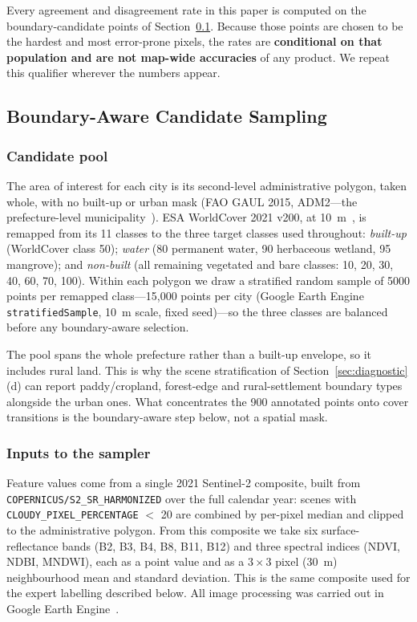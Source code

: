 Every agreement and disagreement rate in this paper is computed on the
boundary-candidate points of Section~\ref{sec:sampling}. Because those points
are chosen to be the hardest and most error-prone pixels, the rates are
\textbf{conditional on that population and are not map-wide accuracies} of any
product. We repeat this qualifier wherever the numbers appear.

\subsection{Boundary-Aware Candidate Sampling}\label{sec:sampling}

\subsubsection*{Candidate pool}

The area of interest for each city is its second-level administrative polygon,
taken whole, with no built-up or urban mask (FAO GAUL 2015, ADM2---the
prefecture-level municipality~\citep{fao2015gaul}). ESA WorldCover 2021 v200, at
10~m~\citep{zanaga2022}, is remapped from its 11 classes to the three target
classes used throughout: \emph{built-up} (WorldCover class 50); \emph{water} (80
permanent water, 90 herbaceous wetland, 95 mangrove); and \emph{non-built} (all
remaining vegetated and bare classes: 10, 20, 30, 40, 60, 70, 100). Within each
polygon we draw a stratified random sample of 5000 points per remapped
class---15,000 points per city (Google Earth Engine \texttt{stratifiedSample},
10~m scale, fixed seed)---so the three classes are balanced before any
boundary-aware selection.

The pool spans the whole prefecture rather than a built-up envelope, so it
includes rural land. This is why the scene stratification of
Section~\ref{sec:diagnostic}(d) can report paddy/cropland, forest-edge and
rural-settlement boundary types alongside the urban ones. What concentrates the
900 annotated points onto cover transitions is the boundary-aware step below,
not a spatial mask.

\subsubsection*{Inputs to the sampler}

Feature values come from a single 2021 Sentinel-2 composite, built from
\texttt{COPERNICUS/S2\_SR\_HARMONIZED} over the full calendar year: scenes with
\texttt{CLOUDY\_PIXEL\_PERCENTAGE} $<$ 20 are combined by per-pixel median and
clipped to the administrative polygon. From this composite we take six
surface-reflectance bands (B2, B3, B4, B8, B11, B12) and three spectral indices
(NDVI, NDBI, MNDWI), each as a point value and as a $3 \times 3$ pixel (30~m)
neighbourhood mean and standard deviation. This is the same composite used for
the expert labelling described below. All image processing was carried out in
Google Earth Engine~\citep{gorelick2017}.

